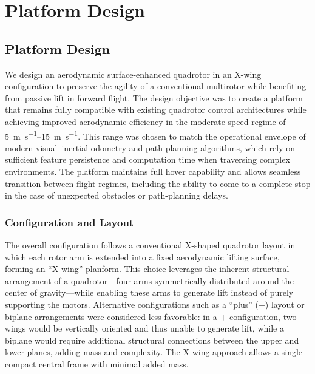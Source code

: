 
\chapter{Platform Design}\label{chapter:platform-design}

\section{Platform Design}
\label{sec:platform_design}

We design an aerodynamic surface-enhanced quadrotor in an X-wing configuration to preserve the agility of a conventional multirotor while benefiting from passive lift in forward flight.  
The design objective was to create a platform that remains fully compatible with existing quadrotor control architectures while achieving improved aerodynamic efficiency in the moderate-speed regime of \SIrange{5}{15}{\meter\per\second}.  
This range was chosen to match the operational envelope of modern visual–inertial odometry and path-planning algorithms, which rely on sufficient feature persistence and computation time when traversing complex environments.  
The platform maintains full hover capability and allows seamless transition between flight regimes, including the ability to come to a complete stop in the case of unexpected obstacles or path-planning delays.

\subsection{Configuration and Layout}

The overall configuration follows a conventional X-shaped quadrotor layout in which each rotor arm is extended into a fixed aerodynamic lifting surface, forming an ``X-wing'' planform.  
This choice leverages the inherent structural arrangement of a quadrotor—four arms symmetrically distributed around the center of gravity—while enabling these arms to generate lift instead of purely supporting the motors.  
Alternative configurations such as a ``plus'' (\(+\)) layout or biplane arrangements were considered less favorable:  
in a \(+\) configuration, two wings would be vertically oriented and thus unable to generate lift, while a biplane would require additional structural connections between the upper and lower planes, adding mass and complexity.  
The X-wing approach allows a single compact central frame with minimal added mass.

